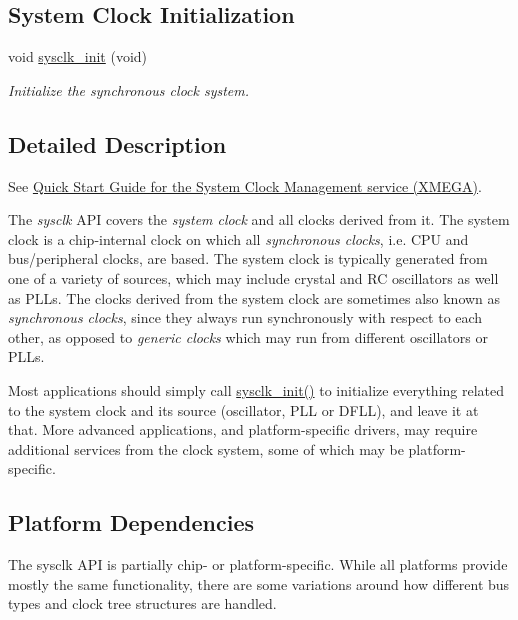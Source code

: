 \subsection*{System Clock Initialization}
\begin{DoxyCompactItemize}
\item 
void \hyperlink{group__sysclk__group_ga242399e48a97739c88b4d0c00f6101de}{sysclk\-\_\-init} (void)
\begin{DoxyCompactList}\small\item\em Initialize the synchronous clock system. \end{DoxyCompactList}\end{DoxyCompactItemize}


\subsection{Detailed Description}
See \hyperlink{sysclk_quickstart}{Quick Start Guide for the System Clock Management service (X\-M\-E\-G\-A)}.

The {\itshape sysclk} A\-P\-I covers the {\itshape system clock} and all clocks derived from it. The system clock is a chip-\/internal clock on which all {\itshape synchronous clocks}, i.\-e. C\-P\-U and bus/peripheral clocks, are based. The system clock is typically generated from one of a variety of sources, which may include crystal and R\-C oscillators as well as P\-L\-Ls. The clocks derived from the system clock are sometimes also known as {\itshape synchronous clocks}, since they always run synchronously with respect to each other, as opposed to {\itshape generic clocks} which may run from different oscillators or P\-L\-Ls.

Most applications should simply call \hyperlink{group__sysclk__group_ga242399e48a97739c88b4d0c00f6101de}{sysclk\-\_\-init()} to initialize everything related to the system clock and its source (oscillator, P\-L\-L or D\-F\-L\-L), and leave it at that. More advanced applications, and platform-\/specific drivers, may require additional services from the clock system, some of which may be platform-\/specific.\hypertarget{group__sysclk__group_sysclk_group_platform}{}\subsection{Platform Dependencies}\label{group__sysclk__group_sysclk_group_platform}
The sysclk A\-P\-I is partially chip-\/ or platform-\/specific. While all platforms provide mostly the same functionality, there are some variations around how different bus types and clock tree structures are handled.

